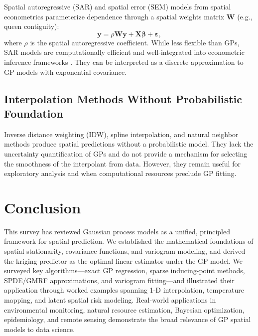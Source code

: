 \documentclass[conference]{IEEEtran}
\begin{document}
Spatial autoregressive (SAR) and spatial error (SEM) models from spatial econometrics parameterize dependence through a spatial weights matrix $\mathbf{W}$ (e.g., queen contiguity):
\begin{equation}
  \mathbf{y} = \rho \mathbf{W}\mathbf{y} + \mathbf{X}\bm{\beta} + \bm{\varepsilon},
  \label{eq:sar}
\end{equation}
where $\rho$ is the spatial autoregressive coefficient. While less flexible than GPs, SAR models are computationally efficient and well-integrated into econometric inference frameworks \cite{anselin1988spatial}. They can be interpreted as a discrete approximation to GP models with exponential covariance.

\subsection{Interpolation Methods Without Probabilistic Foundation}

Inverse distance weighting (IDW), spline interpolation, and natural neighbor methods produce spatial predictions without a probabilistic model. They lack the uncertainty quantification of GPs and do not provide a mechanism for selecting the smoothness of the interpolant from data. However, they remain useful for exploratory analysis and when computational resources preclude GP fitting.

\section{Conclusion}
\label{sec:conclusion}

This survey has reviewed Gaussian process models as a unified, principled framework for spatial prediction. We established the mathematical foundations of spatial stationarity, covariance functions, and variogram modeling, and derived the kriging predictor as the optimal linear estimator under the GP model. We surveyed key algorithms---exact GP regression, sparse inducing-point methods, SPDE/GMRF approximations, and variogram fitting---and illustrated their application through worked examples spanning 1-D interpolation, temperature mapping, and latent spatial risk modeling. Real-world applications in environmental monitoring, natural resource estimation, Bayesian optimization, epidemiology, and remote sensing demonstrate the broad relevance of GP spatial models to data science.
\end{document}
